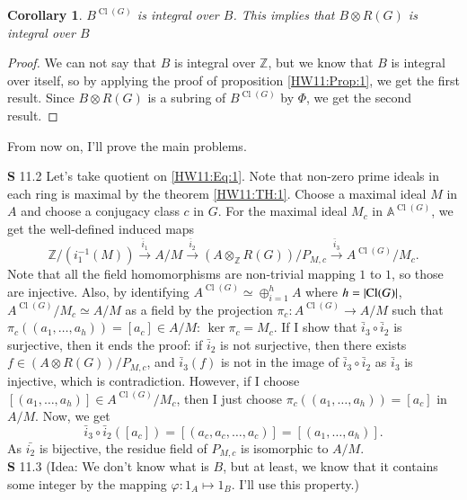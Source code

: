 \documentclass[a4paper, 12pt]{article}
\theoremstyle{Mydefinition}
\theoremstyle{Mytheorem}
\newtheorem{corollary}[statement]{Corollary}
\DeclareMathOperator{\cl}{Cl}
\begin{document}
\begin{corollary}\label{HW11:Cor:4}
$B^{\cl(G)}$ is integral over $B$. This implies that $B\otimes R(G)$ is integral over $B$
\end{corollary}
\begin{proof}
We can not say that $B$ is integral over $\mathbb{Z}$, but we know that $B$ is integral over itself, so by applying the proof of proposition \ref{HW11:Prop:1}, we get the first result. Since $B\otimes R(G)$ is a subring of $B^{\cl(G)}$ by $\Phi$, we get the second result. 
\end{proof}

From now on, I'll prove the main problems.

\noindent \textbf{S} 11.2
Let's take quotient on \eqref{HW11:Eq:1}. Note that non-zero prime ideals in each ring is maximal by the theorem \ref{HW11:TH:1}. Choose a maximal ideal $M$ in $A$ and choose a conjugacy class $c$ in $G$. For the maximal ideal $M_c$ in $\mathbb{A}^{\cl(G)}$, we get the well-defined induced maps
\begin{equation}
    \mathbb{Z}/(i^{-1}_1(M))\xrightarrow{\bar{i}_1} A/M\xrightarrow{\bar{i}_2}(A\otimes_{\mathbb{Z}} R(G))/P_{M,c}\xrightarrow{\bar{i}_3}A^{\cl(G)}/M_c.
\end{equation}
Note that all the field homomorphisms are non-trivial mapping $1$ to $1$, so those are injective. Also, by identifying $A^{\cl(G)}\simeq \oplus_{i=1}^h A$ where $h=\abs{\cl(G)}$, $A^{\cl(G)}/M_c\simeq A/M$ as a field by the projection $\pi_c:A^{\cl(G)}\rightarrow A/M$ such that $\pi_c((a_1, \ldots, a_h)) = [a_c]\in A/M$: $\ker\pi_c =M_c$. If I show that $\bar{i}_3\circ \bar{i}_2$ is surjective, then it ends the proof: if $\bar{i}_2$ is not surjective, then there exists $f\in (A\otimes R(G))/P_{M,c}$, and $\bar{i}_3(f)$ is not in the image of $\bar{i}_3\circ \bar{i}_2$ as $\bar{i}_3$ is injective, which is contradiction. However, if I choose $[(a_1, \ldots, a_h)]\in A^{\cl(G)}/M_c$, then I just choose $\pi_c((a_1, \ldots, a_h)) = [a_c]$ in $A/M$. Now, we get 
\begin{equation}
    \bar{i}_3\circ \bar{i}_2([a_c]) = [(a_c, a_c,\ldots ,a_c)] = [(a_1, \ldots, a_h)].
\end{equation}
As $\bar{i_2}$ is bijective, the residue field of $P_{M,c}$ is isomorphic to $A/M$.\\

\noindent \textbf{S} 11.3
(Idea: We don't know what is $B$, but at least, we know that it contains some integer by the mapping $\varphi:1_A\mapsto 1_B$. I'll use this property.)
\end{document}
